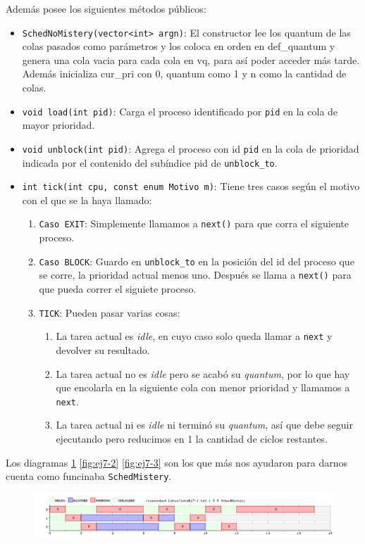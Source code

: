 Además posee los siguientes métodos públicos:
\begin{itemize}
	\item \texttt{SchedNoMistery(vector<int> argn)}: El constructor lee los quantum de las colas pasados como parámetros y los coloca en orden en def\_quantum y genera una cola vacia  para cada cola en vq, para así poder acceder más tarde. Además inicializa cur\_pri con 0, quantum como 1 y n como la cantidad de colas.
	\item \texttt{void load(int pid)}: Carga el proceso identificado por \texttt{pid} en la cola de mayor prioridad. 
	\item \texttt{void unblock(int pid)}: Agrega el proceso con id \texttt{pid} en la cola de prioridad indicada por el contenido del subíndice pid de \texttt{unblock\_to}.
	\item \texttt{int tick(int cpu, const enum Motivo m)}: Tiene tres casos según el motivo con el que se la haya llamado:
	\begin{enumerate}
		\item \texttt{Caso EXIT}: Simplemente llamamos a \texttt{next()} para que corra el siguiente proceso.
		\item \texttt{Caso BLOCK}: Guardo en \texttt{unblock\_to} en la posición del id del proceso que se corre, la prioridad actual menos uno. Después se llama a \texttt{next()} para que pueda correr el siguiete proceso.
		\item \texttt{TICK}: Pueden pasar varias cosas:
		\begin{enumerate}
			\item La tarea actual es \emph{idle}, en cuyo caso solo queda llamar a \texttt{next} y devolver su resultado.
			\item La tarea actual no es \emph{idle} pero se acabó su \emph{quantum}, por lo que hay que encolarla en la siguiente cola con menor prioridad y llamamos a \texttt{next}.
			\item La tarea actual ni es \emph{idle} ni terminó su \emph{quantum}, así que debe seguir ejecutando pero reducimos en 1 la cantidad de ciclos restantes.
		\end{enumerate}
	\end{enumerate}
\end{itemize}

Los diagramas \ref{fig:ej7-1} \ref{fig:ej7-2} \ref{fig:ej7-3} son los que más nos ayudaron para darnos cuenta como funcinaba \texttt{SchedMistery}.

\begin{figure}[H]
  \centering
  \includegraphics[width=1\textwidth]{img/imgEj7-1}
  \caption{}
  \label{fig:ej7-1}
\end{figure}

